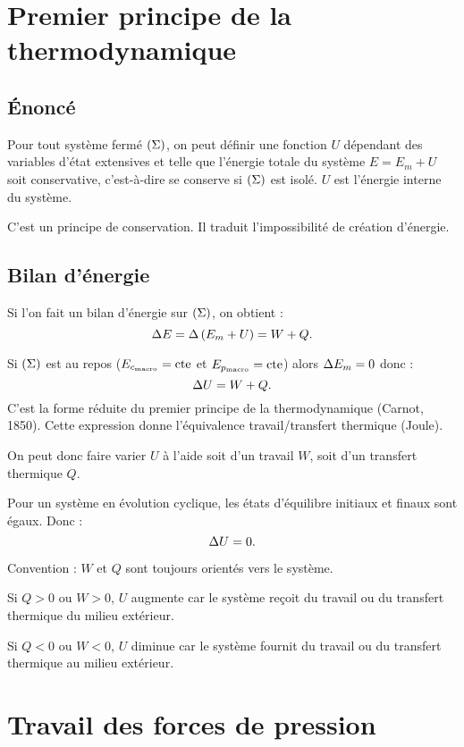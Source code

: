 \section{Premier principe de la thermodynamique}

\subsection{Énoncé}

Pour tout système fermé \(\left(\Sigma\right)\), on peut définir une fonction \(U\) dépendant des variables d'état extensives et telle que l'énergie totale du système \(E=E_m+U\) soit conservative, c'est-à-dire se conserve si \(\left(\Sigma\right)\) est isolé. \(U\) est l'énergie interne du système.

C'est un principe de conservation. Il traduit l'impossibilité de création d'énergie.

\subsection{Bilan d'énergie}

Si l'on fait un bilan d'énergie sur \(\left(\Sigma\right)\), on obtient : \[\adif{E}=\adif{\paren{E_m+U}}=W+Q.\]

Si \(\left(\Sigma\right)\) est au repos (\(E_{c_\text{macro}}=\mathrm{cte}\) et \(E_{p_\text{macro}}=\mathrm{cte}\)) alors \(\adif{E_m}=0\) donc : \[\adif{U}=W+Q.\] C'est la forme réduite du premier principe de la thermodynamique (Carnot, 1850). Cette expression donne l'équivalence travail/transfert thermique (Joule).

On peut donc faire varier \(U\) à l'aide soit d'un travail \(W\), soit d'un transfert thermique \(Q\).

Pour un système en évolution cyclique, les états d'équilibre initiaux et finaux sont égaux. Donc : \[\adif{U}=0.\]

Convention : \(W\) et \(Q\) sont toujours orientés vers le système.

Si \(Q>0\) ou \(W>0\), \(U\) augmente car le système reçoit du travail ou du transfert thermique du milieu extérieur.

Si \(Q<0\) ou \(W<0\), \(U\) diminue car le système fournit du travail ou du transfert thermique au milieu extérieur.

\section{Travail des forces de pression}


